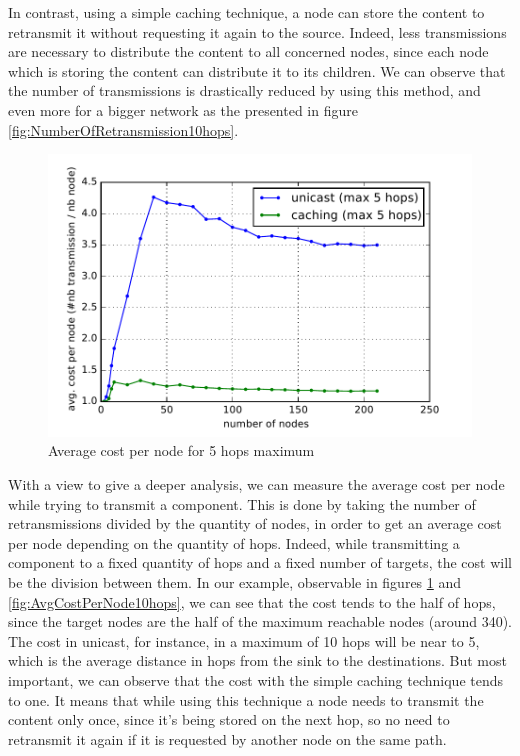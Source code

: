 In contrast, using a simple caching technique, a node can store the content to retransmit it without requesting it again to the source.
Indeed, less transmissions are necessary to distribute the content to all concerned nodes, since each node which is storing the content can distribute it to its children.
We can observe that the number of transmissions is drastically reduced by using this method, and even more for a bigger network as the presented in figure \ref{fig:NumberOfRetransmission10hops}.

\begin{figure}[]
	\centering
	\includegraphics[width=0.8 \columnwidth]{chapters/calpulli.images/avg-cost-per-node-5.pdf}
	\caption{Average cost per node for 5 hops maximum} \label{fig:AvgCostPerNode5hops}
\end{figure}

With a view to give a deeper analysis, we can measure the average cost per node while trying to transmit a component.
This is done by taking the number of retransmissions divided by the quantity of nodes, in order to get an average cost per node depending on the quantity of hops.
Indeed, while transmitting a component to a fixed quantity of hops and a fixed number of targets, the cost will be the division between them.
In our example, observable in figures \ref{fig:AvgCostPerNode5hops} and \ref{fig:AvgCostPerNode10hops}, we can see that the cost tends to the half of hops, since the target nodes are the half of the maximum reachable nodes (around 340).
The cost in unicast, for instance, in a maximum of 10 hops will be near to 5, which is the average distance in hops from the sink to the destinations.
But most important, we can observe that the cost with the simple caching technique tends to one.
It means that while using this technique a node needs to transmit the content only once, since it's being stored on the next hop, so no need to retransmit it again if it is requested by another node on the same path.

